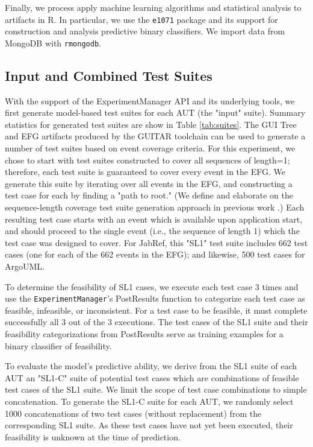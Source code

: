 Finally, we process apply machine learning algorithms and statistical analysis to artifacts in R. In particular, we use the \texttt{e1071} package
and its support for construction and analysis predictive binary classifiers. We import data from MongoDB with \texttt{rmongodb}.

\subsection{ Input and Combined Test Suites }

With the support of the ExperimentManager API and its underlying tools, we first generate model-based
test suites for each AUT (the "input" suite). Summary statistics for generated test suites are show in Table
\ref{tab:suites}. The GUI Tree and EFG artifacts produced by the GUITAR toolchain
can be used to generate a number of test suites based on event coverage criteria. For this experiment,
we chose to start with test
suites constructed to cover all sequences of length=1; therefore, each test suite is guaranteed to cover every event in
the EFG. We generate this suite by iterating over all events in the EFG, and constructing a test case for each
by finding a "path to root." (We define and elaborate on the sequence-length coverage test suite generation approach
in previous work \cite{YYY, ZZZ, AAA}.)
Each resulting test case starts with an event which is available upon application start,
and should proceed to the single event (i.e., the sequence of length 1) which the test case was designed to cover.
For JabRef, this "SL1" test suite includes 662 test cases (one for each of the 662 events in the EFG); and likewise,
500 test cases for ArgoUML.

To determine the feasibility of SL1 cases, we execute each test case 3 times and use the \texttt{ExperimentManager}'s
PostResults function to categorize each test case as feasible, infeasible, or inconsistent. For a test case to be feasible, it must
complete successfully all 3 out of the 3 executions. The test cases of the SL1 suite and their feasibility categorizations
from PostResults serve as training examples for a binary classifier of feasibility.

To evaluate the model's predictive ability, we derive from
the SL1 suite of each AUT an "SL1-C" suite of potential test cases which are combinations of feasible test cases of the
SL1 suite. 
We limit the scope of test case combinations to simple concatenation. To generate the SL1-C suite for each AUT, we randomly
select 1000 concatenations of two test cases (without replacement) from the corresponding SL1 suite. As these test cases
have not yet been executed, their feasibility is unknown at the time of prediction.

